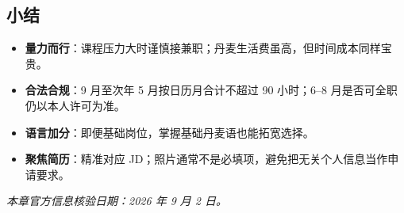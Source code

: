 \subsection{小结}

\begin{itemize}
  \item \textbf{量力而行}：课程压力大时谨慎接兼职；丹麦生活费虽高，但时间成本同样宝贵。
  \item \textbf{合法合规}：9 月至次年 5 月按日历月合计不超过 90 小时；6--8 月是否可全职仍以本人许可为准。
  \item \textbf{语言加分}：即便基础岗位，掌握基础丹麦语也能拓宽选择。
  \item \textbf{聚焦简历}：精准对应 JD；照片通常不是必填项，避免把无关个人信息当作申请要求。
\end{itemize}

\noindent\textit{本章官方信息核验日期：2026 年 9 月 2 日。}
